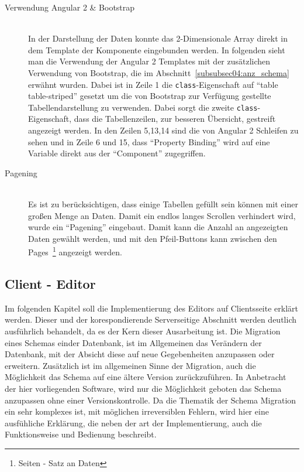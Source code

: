\begin{description}
\item[Verwendung Angular 2 \& Bootstrap] \hfill\\
In der Darstellung der Daten konnte das 2-Dimensionale Array direkt in dem Template der Komponente eingebunden werden. In folgenden sieht man die Verwendung der Angular 2 Templates mit der zusätzlichen Verwendung von Bootstrap, die im Abschnitt~\ref{subsubsec04:anz_schema} erwähnt wurden.
Dabei ist in Zeile 1 die \texttt{class}-Eigenschaft auf ``table table-striped'' gesetzt um die von Bootstrap zur Verfügung gestellte Tabellendarstellung zu verwenden. Dabei sorgt die zweite \texttt{class}-Eigenschaft, dass die Tabellenzeilen, zur besseren Übersicht, gestreift angezeigt werden.
In den Zeilen 5,13,14 sind die von Angular 2 Schleifen zu sehen und in Zeile 6 und 15, dass ``Property Binding'' wird auf eine Variable direkt aus der ``Component'' zugegriffen.



\item[Pagening] \hfill\\
Es ist zu berücksichtigen, dass einige Tabellen gefüllt sein können mit einer großen Menge an Daten. Damit ein endlos langes Scrollen verhindert wird, wurde ein ``Pagening'' eingebaut. Damit kann die Anzahl an angezeigten Daten gewählt werden, und mit den Pfeil-Buttons kann zwischen den Pages~\footnote{Seiten - Satz an Daten} angezeigt werden. 

\end{description}

\newpage

\subsection{Client - Editor}
\label{subsec04:client_edit}

Im folgenden Kapitel soll die Implementierung des Editors auf Clientsseite erklärt werden. Dieser und der korespondierende Serverseitige Abschnitt werden deutlich ausführlich behandelt, da es der Kern dieser Ausarbeitung ist.
Die Migration eines Schemas einder Datenbank, ist im Allgemeinen das Verändern der Datenbank, mit der Absicht diese auf neue Gegebenheiten anzupassen oder erweitern. Zusätzlich ist im allgemeinen Sinne der Migration, auch die Möglichkeit das Schema auf eine ältere Version zurückzuführen.
In Anbetracht der hier vorliegenden Software, wird nur die Möglichkeit geboten das Schema anzupassen ohne einer Versionskontrolle.
Da die Thematik der Schema Migration ein sehr komplexes ist, mit möglichen ir­re­ver­si­blen Fehlern, wird hier eine ausfühliche Erklärung, die neben der art der Implementierung, auch die Funktionsweise und Bedienung beschreibt.

